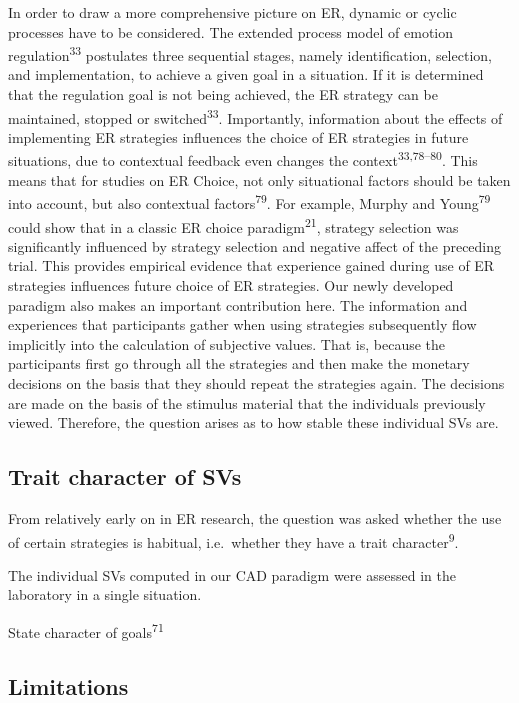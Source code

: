 \documentclass[
  man,floatsintext]{apa6}
\begin{document}
In order to draw a more comprehensive picture on ER, dynamic or cyclic processes have to be considered.
The extended process model of emotion regulation\textsuperscript{33} postulates three sequential stages, namely identification, selection, and implementation, to achieve a given goal in a situation.
If it is determined that the regulation goal is not being achieved, the ER strategy can be maintained, stopped or switched\textsuperscript{33}.
Importantly, information about the effects of implementing ER strategies influences the choice of ER strategies in future situations, due to contextual feedback even changes the context\textsuperscript{33,78--80}.
This means that for studies on ER Choice, not only situational factors should be taken into account, but also contextual factors\textsuperscript{79}.
For example, Murphy and Young\textsuperscript{79} could show that in a classic ER choice paradigm\textsuperscript{21}, strategy selection was significantly influenced by strategy selection and negative affect of the preceding trial.
This provides empirical evidence that experience gained during use of ER strategies influences future choice of ER strategies.
Our newly developed paradigm also makes an important contribution here.
The information and experiences that participants gather when using strategies subsequently flow implicitly into the calculation of subjective values.
That is, because the participants first go through all the strategies and then make the monetary decisions on the basis that they should repeat the strategies again.
The decisions are made on the basis of the stimulus material that the individuals previously viewed.
Therefore, the question arises as to how stable these individual SVs are.

\hypertarget{trait-character-of-svs}{%
\subsection{Trait character of SVs}\label{trait-character-of-svs}}

From relatively early on in ER research, the question was asked whether the use of certain strategies is habitual, i.e.~whether they have a trait character\textsuperscript{9}.

The individual SVs computed in our CAD paradigm were assessed in the laboratory in a single situation.

State character of goals\textsuperscript{71}

\hypertarget{limitations}{%
\subsection{Limitations}\label{limitations}}
\end{document}

